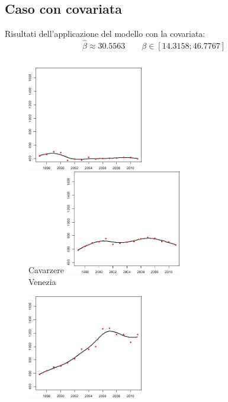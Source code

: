 \documentclass[landscape,9pt]{beamer}                           %
\begin{document}
\subsection{Caso con covariata}
\begin{frame}
Risultati dell'applicazione del modello con la covariata:
$$
\hat{\beta}\approx 30.5563 \qquad \beta \in [14.3158;46.7767]
$$
\begin{columns}
	\begin{column}{0.45\textwidth}
	\begin{figure}
	\begin{multicols}{2}
	\centering
	\includegraphics[width=0.45\textwidth]{Immagini/VeneziaCovar/Cavarzere.png}\\
	Cavarzere 
	\includegraphics[width=0.45\textwidth]{Immagini/VeneziaCovar/Venezia.png}\\
	Venezia 
	\end{multicols}
	\begin{multicols}{2}
	\centering
	\includegraphics[width=0.45\textwidth]{Immagini/VeneziaCovar/Cavallino-Treporti.png}\\

\end{multicols}
\end{figure}
\end{column}
\end{columns}
\end{frame}
\end{document}
